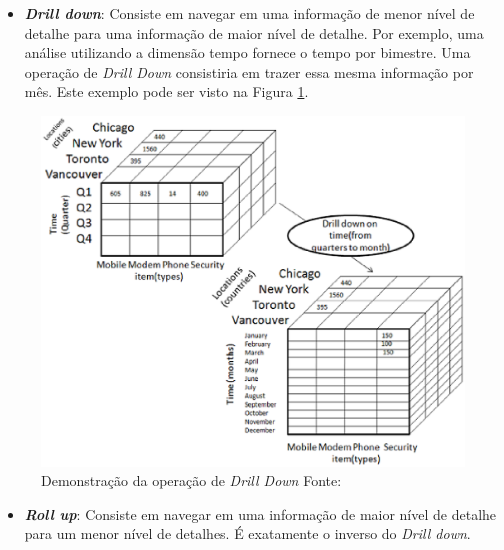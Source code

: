 \begin{itemize}

	\item \textbf{\emph{Drill down}}: Consiste em navegar em uma informação de menor nível de detalhe para uma informação de maior nível de detalhe. Por exemplo, uma análise utilizando a dimensão tempo fornece o tempo por bimestre. Uma operação de \emph{Drill Down} consistiria em trazer essa mesma informação por mês. Este exemplo pode ser visto na Figura \ref{fig-dw-rollup}.
\end{itemize}
	
\begin{figure}[!htb]
 	\centering
 		\includegraphics[scale=0.7]{figuras/dw-drill-down}
 		\caption{Demonstração da operação de \emph{Drill Down}   Fonte: \cite{TutorialsPoint}}
 		\label{fig-dw-rollup}
 \end{figure}

\begin{itemize}
	\item \textbf{\emph{Roll up}}: Consiste em navegar em uma informação de maior nível de detalhe para um menor nível de detalhes. É exatamente o inverso do \emph{Drill down}.
 \end{itemize}


